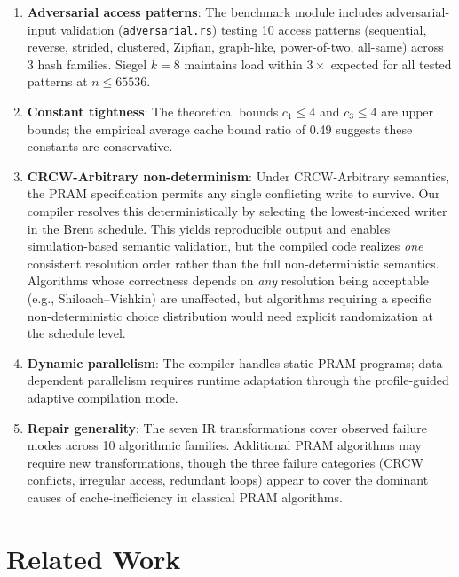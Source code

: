 \documentclass[11pt]{article}
\begin{document}
\begin{enumerate}
  based on $n$ and $B$, and the \texttt{overflow\_analysis.rs} module
  implements the SSS failure probability computation with both per-bin
  moment bounds and union-bound aggregation.
\item \textbf{Adversarial access patterns}: The benchmark module includes
  adversarial-input validation (\texttt{adversarial.rs}) testing 10
  access patterns (sequential, reverse, strided, clustered, Zipfian,
  graph-like, power-of-two, all-same) across 3 hash families.  Siegel
  $k = 8$ maintains load within $3\times$ expected for all tested
  patterns at $n \le 65536$.
\item \textbf{Constant tightness}: The theoretical bounds $c_1 \le 4$ and
  $c_3 \le 4$ are upper bounds; the empirical average cache bound
  ratio of 0.49 suggests these constants are conservative.
\item \textbf{CRCW-Arbitrary non-determinism}: Under CRCW-Arbitrary semantics,
  the PRAM specification permits any single conflicting write to survive.
  Our compiler resolves this deterministically by selecting the
  lowest-indexed writer in the Brent schedule.  This yields reproducible
  output and enables simulation-based semantic validation, but the
  compiled code realizes \emph{one} consistent resolution order rather
  than the full non-deterministic semantics.  Algorithms whose correctness
  depends on \emph{any} resolution being acceptable (e.g., Shiloach--Vishkin)
  are unaffected, but algorithms requiring a specific non-deterministic
  choice distribution would need explicit randomization at the schedule level.
\item \textbf{Dynamic parallelism}: The compiler handles static PRAM programs;
  data-dependent parallelism requires runtime adaptation through the
  profile-guided adaptive compilation mode.
\item \textbf{Repair generality}: The seven IR transformations cover observed
  failure modes across 10 algorithmic families.  Additional PRAM algorithms
  may require new transformations, though the three failure categories
  (CRCW conflicts, irregular access, redundant loops) appear to cover
  the dominant causes of cache-inefficiency in classical PRAM algorithms.
\end{enumerate}

\section{Related Work}
\label{sec:related}
\end{document}
